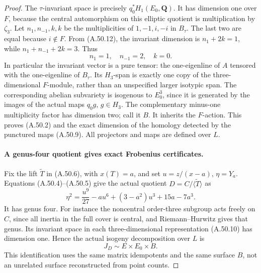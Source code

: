 \begin{proof}
The \(\tau\)-invariant space is precisely
\(q_0^*H_1(E_0,\mathbf Q)\). It has dimension
one over \(F\), because the central automorphism
on this elliptic quotient is multiplication by
\(\zeta_3\). Let \(n_1,n_{-1},k,k\) be the
multiplicities of \(1,-1,i,-i\) in \(B_\tau\).
The last two are equal because \(i\notin F\).
From (A.50.12), the invariant dimension is
\(n_1+2k=1\), while \(n_1+n_{-1}+2k=3\).
Thus
\[
                         n_1=1,\quad n_{-1}=2,\quad k=0.
                                                               \tag{A.50.13}
\]
In particular the invariant vector is a pure tensor:
the one-eigenline of \(A\) tensored with the
one-eigenline of \(B_\tau\). Its \(H_3\)-span
is exactly one copy of the three-dimensional
\(F\)-module, rather than an unspecified larger
isotypic span. The corresponding abelian subvariety
is isogenous to \(E_0^3\), since it is generated
by the images of the actual maps
\(q_0g\), \(g\in H_3\). The complementary
minus-one multiplicity factor has dimension two;
call it \(B\). It inherits the \(F\)-action.
This proves (A.50.2) and the exact dimension of the
homology detected by the punctured maps (A.50.9).
All projectors and maps are defined over \(L\).

\paragraph{A genus-four quotient gives exact Frobenius certificates.}
Fix the lift \(\widetilde T\) in (A.50.6), with
\(x(T)=a\), and set
\(u=z/(x-a)\), \(\eta=Y_a\).
Equations (A.50.4)--(A.50.5) give the actual quotient
\(D=C/\langle\widetilde T\rangle\) as
\[
 \eta^2=\frac{u^9}{27}-a u^6+(3-a^2)u^3+15a-7a^3.
                                                               \tag{A.50.14}
\]
It has genus four. For instance the noncentral
order-three subgroup acts freely on \(C\), since
all inertia in the full cover is central, and
Riemann--Hurwitz gives that genus. Its invariant
space in each three-dimensional representation
(A.50.10) has dimension one. Hence the actual
isogeny decomposition over \(L\) is
\[
                              J_D\sim E\times E_0\times B.
                                                               \tag{A.50.15}
\]
This identification uses the same matrix idempotents
and the same surface \(B\), not an unrelated
surface reconstructed from point counts.


\end{proof}
